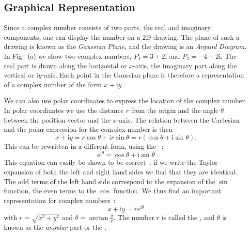 

\subsection{Graphical Representation}

Since a complex number consists of two parts, the real and imaginary components, one can display the number on a 2D drawing.
The plane of such a drawing is known as the \textit{Gaussian Plane}, and the drawing is an \textit{Argand Diagram}.
In Fig.~(a) we show two complex numbers, $P_1=3+2\mathrm{i}$ and $P_2=-4-2\mathrm{i}$.  The real part is drawn along the 
horizontal or $x$-axis, the imaginary part along the vertical or $\mathrm{i}y$-axis.  Each point in the Gaussian plane is therefore a representation of a complex number of the form $x+\mathrm{i}y$.

We can also use polar coordinates to express the location of the complex number.  In polar coordinates
we use the distance $r$ from the origin and the angle $\theta$ between the position vector and the $x$-axis.
The relation between the Cartesian and the polar expression for the complex number is then
\begin{equation}
x+\mathrm{i}y=r\cos\theta+\mathrm{i}r\sin\theta=r(\cos\theta+\mathrm{i}\sin\theta).
\end{equation}
This can be rewritten in a different form, using the ~:
\begin{equation}
	\mathrm{e}^{\mathrm{i}\theta}=\cos\theta+\mathrm{i}\sin\theta
\end{equation}
This equation can easily be shown to be correct~:  if we write the Taylor expansion of both the left and right hand sides
we find that they are identical.  The odd terms of the left hand side correspond to the expansion of the $\sin$ function, the
even terms to the $\cos$ function.  We thus find an important representation for complex numbers~:
\begin{equation}
	x+\mathrm{i}y=re^{\mathrm{i}\theta}
\end{equation}
with $r=\sqrt{x^2+y^2}$ and $\theta=\arctan\frac{y}{x}$.  The number $r$ is called the , and $\theta$ is known as the \textit{angular} part or the .

